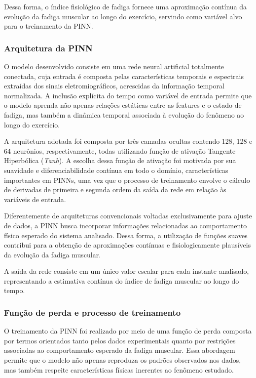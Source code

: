 \documentclass[symbols]{fei}
\begin{document}
Dessa forma, o índice fisiológico de fadiga 
fornece uma aproximação contínua da evolução da 
fadiga muscular ao longo do exercício, servindo como variável 
alvo para o treinamento da PINN.


\subsubsection{Arquitetura da PINN}

O modelo desenvolvido consiste em uma rede neural artificial totalmente 
conectada, cuja entrada é composta pelas características temporais e espectrais extraídas dos sinais 
eletromiográficos, acrescidas da informação temporal normalizada. A inclusão explícita do tempo como variável de 
entrada permite que o modelo aprenda não apenas relações estáticas entre as features e o estado de fadiga, mas também a 
dinâmica temporal associada à evolução do fenômeno ao longo do exercício.

A arquitetura adotada foi composta por três camadas ocultas contendo 128, 128 e 64 neurônios, respectivamente, todas utilizando função de ativação
Tangente Hiperbólica (\textit{Tanh}). A escolha dessa função de ativação foi motivada por sua suavidade e 
diferenciabilidade contínua em todo o domínio, características importantes em PINNs, uma vez que o processo de treinamento 
envolve o cálculo de derivadas de primeira e segunda ordem da saída da rede em relação às variáveis de entrada.

Diferentemente de arquiteturas convencionais voltadas exclusivamente para ajuste de dados, a PINN busca incorporar informações 
relacionadas ao comportamento físico esperado do sistema analisado. Dessa forma, a utilização de funções suaves 
contribui para a obtenção de aproximações contínuas e fisiologicamente plausíveis da evolução da fadiga muscular.

A saída da rede consiste em um único valor escalar para cada instante analisado, representando a estimativa 
contínua do índice de fadiga muscular ao longo do tempo.

\subsubsection{Função de perda e processo de treinamento}

O treinamento da PINN foi realizado por meio de uma função de perda composta por termos orientados tanto pelos dados experimentais 
quanto por restrições associadas ao comportamento esperado da fadiga muscular. Essa abordagem permite que o modelo não apenas 
reproduza os padrões observados nos dados, mas também respeite características físicas inerentes ao fenômeno estudado.
\end{document}
